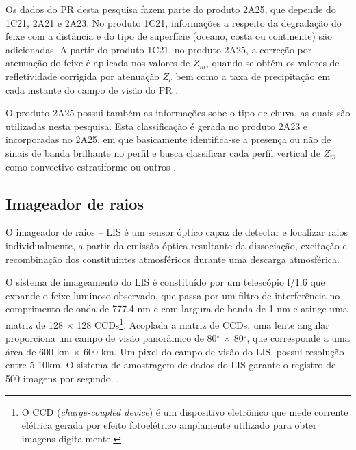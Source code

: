 Os dados do PR desta pesquisa fazem parte do produto 2A25, que depende do 1C21, 2A21 e 2A23. No produto 1C21, informações a respeito da  degradação do feixe com a distância e do tipo de superfície (oceano, costa ou continente) são adicionadas. A partir do produto 1C21, no produto 2A25, a correção por atenuação do feixe é aplicada nos valores de $Z_m$, quando se obtém os valores de refletividade corrigida por atenuação $Z_c$ bem como a taxa de precipitação em cada instante do campo de visão do PR \cite{iguchi1994atenua,meneghini2000,iguchi2000rain}.   

O produto 2A25 possui também as informações sobe o tipo de chuva, as quais são utilizadas nesta pesquisa. Esta classificação é gerada no produto 2A23 e incorporadas no 2A25, em que basicamente identifica-se a presença ou não de sinais de banda brilhante no perfil e busca classificar cada perfil vertical de $Z_m$ como convectivo estratiforme ou outros \cite{awaka1997}. 

      

\subsection{Imageador de raios}

O imageador de raios -- LIS  é um sensor óptico capaz de detectar e localizar raios individualmente, a partir da emissão óptica resultante da dissociação, excitação e recombinação dos constituintes atmosféricos durante uma descarga atmosférica. 

O sistema de imageamento do LIS é constituído por um telescópio f/1.6 que expande o feixe luminoso observado, que passa por um filtro de interferência no comprimento de onda de 777.4 nm e com largura de banda de 1 nm e atinge uma matriz de 128 $\times$ 128 CCDs\footnote{O CCD (\textit{charge-coupled device}) é um dispositivo eletrônico que mede corrente elétrica gerada por efeito fotoelétrico amplamente utilizado para obter imagens digitalmente.}. Acoplada a matriz de CCDs, uma lente angular proporciona um campo de visão panorâmico de 80$^{\circ}$ $\times$ 80$^{\circ}$, que corresponde a uma área de 600 km $\times$ 600 km. Um pixel do campo de visão do LIS, possui resolução entre 5-10km. O sistema de amostragem de dados do LIS garante o registro de 500 imagens por segundo. \cite{christian2000LISalgorithm,boccippio1996science,trmmhandbook}. 

